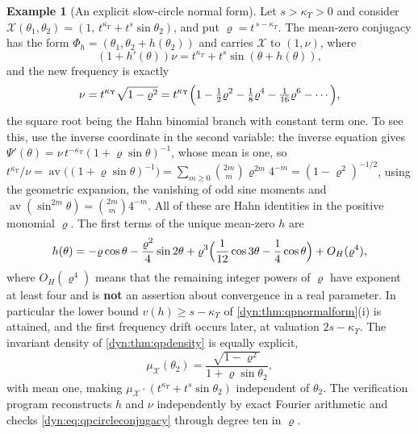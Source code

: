 \documentclass[11pt,letterpaper]{article}
\theoremstyle{definition}
\newtheorem{example}[example]{Example}
\theoremstyle{remark}
\newcommand{\kups}{\kappa_{\Upsilon}}
\newcommand{\av}{\operatorname{av}}
\numberwithin{equation}{section}
\begin{document}
\begin{example}[An explicit slow-circle normal form]\label{dyn:ex:qpcircle}
Let $s>\kups>0$ and consider
$\mathcal X(\theta_1,\theta_2)=(1,\,t^{\kups}+t^{s}\sin\theta_2)$, and put
$\varrho=t^{\,s-\kups}$. The mean-zero conjugacy has the form
$\Phi_h=(\theta_1,\theta_2+h(\theta_2))$ and carries $\mathcal X$ to
$(1,\nu)$, where
\begin{equation}\label{dyn:eq:qpcircleconjugacy}
 (1+h'(\theta))\nu=t^{\kups}+t^{s}\sin(\theta+h(\theta)),
\end{equation}
and the new frequency is exactly
\begin{equation}\label{dyn:eq:qpcirclefrequency}
 \nu=t^{\kups}\sqrt{1-\varrho^{2}}
 =t^{\kups}\Bigl(1-\tfrac12\varrho^{2}-\tfrac18\varrho^{4}
 -\tfrac1{16}\varrho^{6}-\cdots\Bigr),
\end{equation}
the square root being the Hahn binomial branch with constant term one. To
see this, use the inverse coordinate in the second variable: the inverse
equation gives $\Psi'(\theta)=\nu\,t^{-\kups}(1+\varrho\sin\theta)^{-1}$,
whose mean is one, so
$t^{\kups}/\nu=\av\bigl((1+\varrho\sin\theta)^{-1}\bigr)
 =\sum_{m\ge0}\binom{2m}{m}\varrho^{2m}4^{-m}=(1-\varrho^{2})^{-1/2}$,
using the geometric expansion, the vanishing of odd sine moments and
$\av(\sin^{2m}\theta)=\binom{2m}{m}4^{-m}$. All of these are Hahn
identities in the positive monomial $\varrho$. The first terms of the
unique mean-zero $h$ are
\begin{equation}\label{dyn:eq:qpcircleh}
 h(\theta)=-\varrho\cos\theta-\frac{\varrho^{2}}{4}\sin2\theta
 +\varrho^{3}\Bigl(\frac1{12}\cos3\theta-\frac14\cos\theta\Bigr)
 +O_H(\varrho^{4}),
\end{equation}
where $O_H(\varrho^{4})$ means that the remaining integer powers of
$\varrho$ have exponent at least four and is \textbf{not} an assertion
about convergence in a real parameter. In particular the lower bound
$v(h)\ge s-\kups$ of \cref{dyn:thm:qpnormalform}(i) is attained, and the
first frequency drift occurs later, at valuation $2s-\kups$. The invariant
density of \cref{dyn:thm:qpdensity} is equally explicit,
\begin{equation}\label{dyn:eq:qpcircledensity}
 \mu_{\mathcal X}(\theta_2)
 =\frac{\sqrt{1-\varrho^{2}}}{1+\varrho\sin\theta_2},
\end{equation}
with mean one, making $\mu_{\mathcal X}\cdot
(t^{\kups}+t^{s}\sin\theta_2)$ independent of $\theta_2$. The verification
program reconstructs $h$ and $\nu$ independently by exact Fourier
arithmetic and checks \eqref{dyn:eq:qpcircleconjugacy} through degree ten
in $\varrho$.
\end{example}
\end{document}
